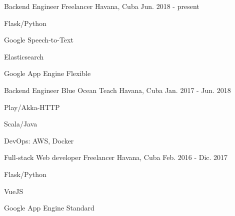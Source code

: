 


\begin{cventries}


\cventry
{Backend Engineer} %
{Freelancer} %
{Havana, Cuba} %
{Jun. 2018 - present} %
{ %
\begin{cvitems}
\item {Flask/Python}
\item {Google Speech-to-Text}
\item {Elasticsearch}
\item {Google App Engine Flexible}
\end{cvitems}
}


\cventry
{Backend Engineer} %
{Blue Ocean Teach} %
{Havana, Cuba} %
{Jan. 2017 - Jun. 2018} %
{ %
\begin{cvitems}
\item {Play/Akka-HTTP}
\item {Scala/Java}
\item {DevOps: AWS, Docker}
\end{cvitems}
}


\cventry
{Full-stack Web developer} %
{Freelancer} %
{Havana, Cuba} %
{Feb. 2016 - Dic. 2017} %
{ %
\begin{cvitems}
\item {Flask/Python}
\item {VueJS}
\item {Google App Engine Standard}
\end{cvitems}
}



\end{cventries}
